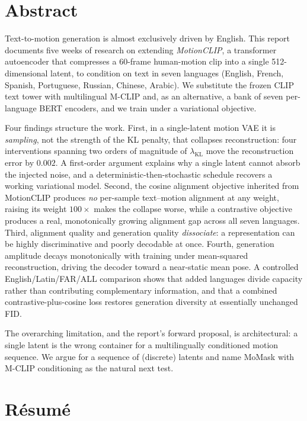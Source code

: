 \documentclass[11pt,a4paper]{report}
\newcommand{\lkl}{\ensuremath{\lambda_{\mathrm{KL}}}}
\begin{document}
\chapter*{Abstract}

Text-to-motion generation is almost exclusively driven by English. This
report documents five weeks of research on extending \emph{MotionCLIP}, a
transformer autoencoder that compresses a 60-frame human-motion clip into
a single 512-dimensional latent, to condition on text in seven languages
(English, French, Spanish, Portuguese, Russian, Chinese, Arabic). We
substitute the frozen CLIP text tower with multilingual M-CLIP and, as an
alternative, a bank of seven per-language BERT encoders, and we train
under a variational objective.

Four findings structure the work. First, in a single-latent motion VAE it
is \emph{sampling}, not the strength of the KL penalty, that collapses
reconstruction: four interventions spanning two orders of magnitude of
\lkl{} move the reconstruction error by $0.002$. A first-order argument
explains why a single latent cannot absorb the injected noise, and a
deterministic-then-stochastic schedule recovers a working variational
model. Second, the cosine alignment objective inherited from MotionCLIP
produces \emph{no} per-sample text--motion alignment at any weight, raising its weight $100\times$ makes the collapse worse, while a
contrastive objective produces a real, monotonically growing alignment gap
across all seven languages. Third, alignment quality and generation
quality \emph{dissociate}: a representation can be highly discriminative
and poorly decodable at once. Fourth, generation amplitude decays
monotonically with training under mean-squared reconstruction, driving the
decoder toward a near-static mean pose. A controlled English/Latin/FAR/ALL
comparison shows that added languages divide capacity rather than
contributing complementary information, and that a combined
contrastive-plus-cosine loss restores generation diversity at essentially
unchanged FID.

The overarching limitation, and the report's forward proposal, is
architectural: a single latent is the wrong container for a
multilingually conditioned motion sequence. We argue for a sequence of
(discrete) latents and name MoMask with M-CLIP conditioning as the natural
next test.

\chapter*{Résumé}
\end{document}
